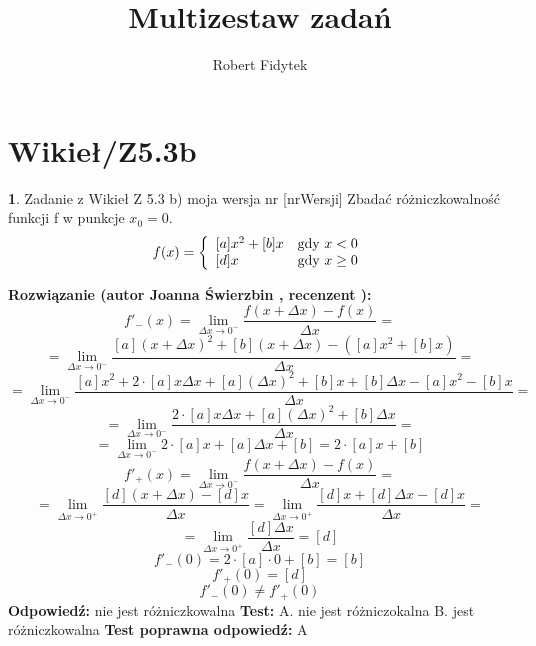 \documentclass[12pt, a4paper]{article}
\title{Multizestaw zadań}
\author{Robert Fidytek}
\date{}
\theoremstyle{definition} %
\newtheorem{zad}{}
\newcommand{\kategoria}[1]{\section{#1}} %
\newcommand{\zadStart}[1]{\begin{zad}#1\newline} %
\newcommand{\zadStop}{\end{zad}}   %
\newcommand{\rozwStart}[2]{\noindent \textbf{Rozwiązanie (autor #1 , recenzent #2): }\newline} %
\newcommand{\rozwStop}{\newline}                                            %
\newcommand{\odpStart}{\noindent \textbf{Odpowiedź:}\newline}    %
\newcommand{\odpStop}{\newline}                                             %
\newcommand{\testStart}{\noindent \textbf{Test:}\newline} %
\newcommand{\testStop}{\newline} %
\newcommand{\kluczStart}{\noindent \textbf{Test poprawna odpowiedź:}\newline} %
\newcommand{\kluczStop}{\newline} %
\begin{document}
\maketitle


\kategoria{Wikieł/Z5.3b}
\zadStart{Zadanie z Wikieł Z 5.3 b) moja wersja nr [nrWersji]}
Zbadać różniczkowalność funkcji f w punkcje $x_0=0$.
$$
f(x) = \left\{ \begin{array}{ll}
[a]x^2+[b]x & \textrm{gdy $x<0$}\\
{[d]}x & \textrm{gdy $ x\geq 0$}
\end{array} \right.
$$
\zadStop
\rozwStart{Joanna Świerzbin}{}
$$f'_{-}(x)=\lim_{\Delta x \rightarrow 0^{-}} \frac{f(x+\Delta x)-f(x)}{\Delta x} = $$ 
$$= \lim_{\Delta x \rightarrow 0^{-}} \frac{[a](x+\Delta x)^2+[b](x+\Delta x) -([a]x^2+[b]x)}{\Delta x}= $$ $$ =
 \lim_{\Delta x \rightarrow 0^{-}}  \frac{[a]x^2+2 \cdot [a] x \Delta x+ [a] (\Delta x)^2+[b]x+[b]\Delta x -[a]x^2-[b]x}{\Delta x} =$$
 $$ = \lim_{\Delta x \rightarrow 0^{-}}  \frac{2 \cdot [a] x \Delta x+ [a] (\Delta x)^2+[b]\Delta x }{\Delta x} =$$
 $$ = \lim_{\Delta x \rightarrow 0^{-}}  {2 \cdot [a] x + [a] \Delta x+[b]} = 2\cdot[a]x+[b]$$
$$f'_{+}(x)=\lim_{\Delta x \rightarrow 0^{-}} \frac{f(x+\Delta x)-f(x)}{\Delta x} = $$ 
$$= \lim_{\Delta x \rightarrow 0^{+}} \frac{[d](x+\Delta x)-[d]x}{\Delta x} =
 \lim_{\Delta x \rightarrow 0^{+}}  \frac{[d]x+[d]\Delta x-[d]x}{\Delta x} =$$
 $$ = \lim_{\Delta x \rightarrow 0^{+}}  \frac{[d]\Delta x}{\Delta x} = [d] $$
$$f'_{-}(0) = 2\cdot[a]\cdot 0+[b] = [b]$$
$$f'_{+}(0) = [d]$$
$$ f'_{-}(0) \neq f'_{+}(0) $$
\rozwStop
\odpStart
nie jest różniczkowalna
\odpStop
\testStart
A. nie jest różniczokalna
B. jest różniczkowalna
\testStop
\kluczStart
A
\kluczStop
\end{document}
